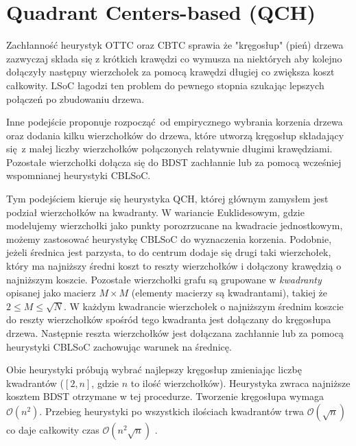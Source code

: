 \section{Quadrant Centers-based (QCH)}
Zachłanność heurystyk OTTC oraz CBTC sprawia że "kręgosłup" (pień) drzewa zazwyczaj składa się z krótkich krawędzi co wymusza na niektórych aby kolejno dołączyły następny wierzchołek za pomocą krawędzi długiej co zwiększa koszt całkowity. LSoC łagodzi ten problem do pewnego stopnia szukając lepszych połączeń po zbudowaniu drzewa.

Inne podejście proponuje rozpocząć od empirycznego wybrania korzenia drzewa oraz dodania kilku wierzchołków do drzewa, które utworzą kręgosłup składający się z małej liczby wierzchołków połączonych relatywnie długimi krawędziami. Pozostałe wierzchołki dołącza się do BDST zachłannie lub za pomocą wcześniej wspomnianej heurystyki CBLSoC.

Tym podejściem kieruje się heurystyka QCH, której głównym zamysłem jest podział wierzchołków na kwadranty. W wariancie Euklidesowym, gdzie modelujemy wierzchołki jako punkty porozrzucane na kwadracie jednostkowym, możemy zastosować heurystykę CBLSoC do wyznaczenia korzenia. Podobnie, jeżeli średnica jest parzysta, to do centrum dodaje się drugi taki wierzchołek, który ma najniższy średni koszt to reszty wierzchołków i dołączony krawędzią o najniższym koszcie. Pozostałe wierzchołki grafu są grupowane w \textit{kwadranty} opisanej jako macierz $M\times M$ (elementy macierzy są kwadrantami), takiej że $2 \leq M \leq \sqrt{N}$. W każdym kwadrancie wierzchołek o najniższym średnim koszcie do reszty wierzchołków spośród tego kwadranta jest dołączany do kręgosłupa drzewa. Następnie reszta wierzchołków jest dołączana zachłannie lub za pomocą heurystyki CBLSoC zachowując warunek na średnicę.

Obie heurystyki próbują wybrać najlepszy kręgosłup zmieniając liczbę kwadrantów ($[2,n]$, gdzie $n$ to ilość wierzchołków). Heurystyka zwraca najniższe kosztem BDST otrzymane w tej procedurze. Tworzenie kręgosłupa wymaga $\mathcal{O}(n^2)$. Przebieg heurystyki po wszystkich ilościach kwadrantów trwa $\mathcal{O}(\sqrt{n})$ co daje całkowity czas $\mathcal{O}(n^2 \sqrt{n})$ \cite{DBLP:journals/informaticaSI/PatvardhanPS15}.